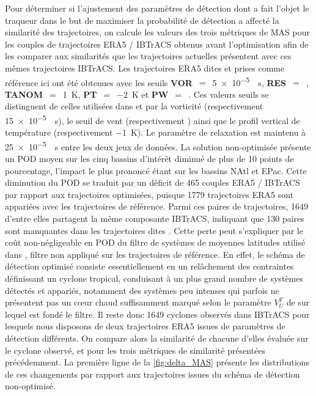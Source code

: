 \documentclass[../main.tex]{subfiles}
\begin{document}
Pour déterminer si l'ajustement des paramètres de détection dont a fait l'objet le traqueur dans le but de maximiser la probabilité de détection a affecté la
similarité des trajectoires, on calcule les valeurs des trois métriques de MAS pour les couples de trajectoires ERA5 / IBTrACS obtenus avant l'optimisation afin
de les comparer aux similarités que les trajectoires actuelles présentent avec ces mêmes trajectoires IBTrACS. Les trajectoires ERA5 dites
 et prises comme référence ici ont été obtenues avec les seuils \textbf{VOR}~$=$~\SI{5e-5}{\per\second}, \textbf{RES}~$=$~,
\textbf{TANOM}~$=$~\SI{1}{\kelvin}, \textbf{PT}~$=$~\SI{-2}{\kelvin} et \textbf{PW}~$=$~. Ces valeurs seuils se distinguent de celles utilisées dans
\cite{dulac_assessing_2023} et \cite{bourdin_intercomparison_2022} par la vorticité (respectivement \SI{15e-5}{\per\second}), le seuil de vent (respectivement
) ainsi que le profil vertical de température (respectivement \SI{-1}{\kelvin}). Le paramètre de relaxation est maintenu à \SI{25e-5}{\per\second} entre
les deux jeux de données. La solution non-optimisée présente un POD moyen sur les cinq bassins d'intérêt diminué de plus de \num{10} points de pourcentage,
l'impact le plus prononcé étant sur les bassins NAtl et EPac. Cette diminution du POD se traduit par un déficit de \num{465} couples ERA5 / IBTrACS par rapport
aux trajectoires optimisées, puisque \num{1779} trajectoires ERA5 sont appariées avec les trajectoires de référence. Parmi ces paires de trajectoires,
\num{1649} d'entre elles partagent la même composante IBTrACS, indiquant que \num{130} paires sont manquantes dans les trajectoires dites
. Cette perte peut s'expliquer par le coût non-négligeable en POD du filtre de systèmes de moyennes latitudes utilisé dans
\cite{dulac_assessing_2023}, filtre non appliqué sur les trajectoires de référence. En effet, le schéma de détection optimisé consiste essentiellement en un
relâchement des contraintes définissant un cyclone tropical, conduisant à un plus grand nombre de systèmes détectés et appariés, notamment des systèmes peu
intenses qui parfois ne présentent pas un cœur chaud suffisamment marqué selon le paramètre $V_U^T$ de \cite{hart_cyclone_2003} sur lequel est fondé le filtre.
Il reste donc \num{1649} cyclones observés dans IBTrACS pour lesquels nous disposons de deux trajectoires ERA5 issues de paramètres de détection différents.
On compare alors la similarité de chacune d'elles évaluée sur le cyclone observé, et pour les trois métriques de similarité présentées précédemment. La première
ligne de la \cref{fig:delta_MAS} présente les distributions de ces changements par rapport aux trajectoires issues du schéma de détection non-optimisé.
\end{document}
